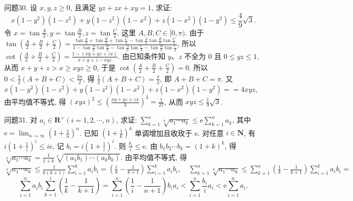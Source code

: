 问题30. 设 $x, y, z \geqslant 0$, 且满足 $y z+z x+x y=1$, 求证:
$$
x\left(1-y^2\right)\left(1-z^2\right)+y\left(1-z^2\right)\left(1-x^2\right)+z\left(1-x^2\right)\left(1-y^2\right) \leqslant \frac{4}{9} \sqrt{3} .
$$
令 $x=\tan \frac{A}{2}, y=\tan \frac{B}{2}, z=\tan \frac{C}{2}$. 这里 $A, B, C \in[0, \pi)$. 由于 $\tan \left(\frac{A}{2}+\frac{B}{2}+\frac{C}{2}\right)=\frac{\tan \frac{A}{2}+\tan \frac{B}{2}+\tan \frac{C}{2}-\tan \frac{A}{2} \tan \frac{B}{2} \tan \frac{C}{2}}{1-\tan \frac{A}{2} \tan \frac{B}{2}-\tan \frac{A}{2} \tan \frac{C}{2}-\tan \frac{B}{2} \tan \frac{C}{2}}$, 所以 $\cot \left(\frac{A}{2}+\frac{B}{2}+\frac{C}{2}\right)=\frac{1-(x y+y z+z x)}{x+y+z-x y z}$. 由已知条件知 $y 、 z$ 不全为 0 且 $0 \leqslant y z \leqslant 1$, 从而 $x+y+z>x \geqslant x y z \geqslant 0$, 于是 $\cot \left(\frac{A}{2}+\frac{B}{2}+\frac{C}{2}\right)=0$. 所以 $0<\frac{1}{2}(A+B+C)<\frac{3 \pi}{2}$, 得 $\frac{1}{2}(A+B+C)=\frac{\pi}{2}$, 即 $A+B+C=\pi$. 又 $x\left(1-y^2\right)\left(1-z^2\right)+y\left(1-z^2\right)\left(1-x^2\right)+z\left(1-x^2\right)\left(1-y^2\right)= =4 x y z$, 由平均值不等式, 得 $(x y z)^2 \leqslant\left(\frac{x y+y z+z x}{3}\right)^3=\frac{1}{27}$, 从而 $x y z \leqslant \frac{1}{9} \sqrt{3}$.



问题31. 对 $a_i \in \mathbf{R}^{+}(i=1,2, \cdots, n)$, 求证: $\sum_{k=1}^n \sqrt[k]{a_1 \cdots a_k} \leqslant \mathrm{e} \sum_{k=1}^n a_k$, 其中 $\mathrm{e}= \lim _{n \rightarrow \infty}\left(1+\frac{1}{n}\right)^n$.
已知 $\left(1+\frac{1}{k}\right)^k$ 单调增加且收玫于 e. 对任意 $i \in \mathbf{N}$, 有 $i\left(1+\frac{1}{i}\right)^i \leqslant i \mathrm{e}$, 记 $b_i=i\left(1+\frac{1}{i}\right)^i$. 则 $\frac{b_i}{i} \leqslant \mathrm{e}$. 由 $b_1 b_2 \cdots b_k=(1+k)^k$, 得 $\sqrt[k]{a_1 \cdots a_k}= \frac{1}{1+k} \sqrt[k]{\left(a_1 b_1\right) \cdots\left(a_k b_k\right)}$. 由平均值不等式, 得 $\sqrt[k]{a_1 \cdots a_k} \leqslant \frac{1}{k(k+1)} \sum_{i=1}^k a_i b_i= \left(\frac{1}{k}-\frac{1}{k+1}\right) \sum_{i=1}^k a_i b_i, \quad \sum_{k=1}^n \sqrt[k]{a_1 \cdots a_k} \leqslant \sum_{k=1}^n\left(\frac{1}{k}-\frac{1}{k+1}\right) \sum_{i=1}^k a_i b_i=$
$$
\sum_{i=1}^n a_i b_i \sum_{k=1}^i\left(\frac{1}{k}-\frac{1}{k+1}\right)=\sum_{i=1}^n\left(\frac{1}{i}-\frac{1}{n+1}\right) b_i a_i<\sum_{i=1}^n \frac{b_i}{i} a_i<\mathrm{e} \sum_{i=1}^n a_i .
$$



